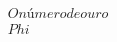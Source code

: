 \documentclass[preview]{standalone}
\begin{document}
\begin{align*}
O número de ouro \\Phi
\end{align*}
\end{document}
